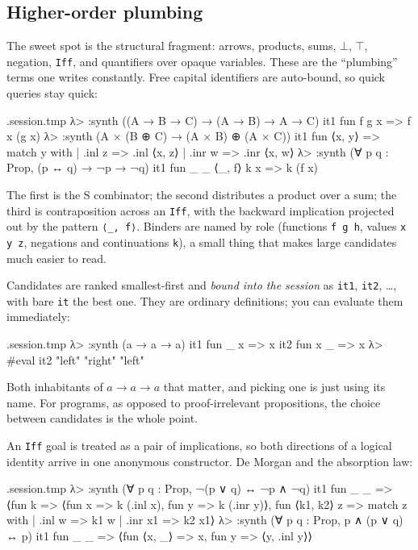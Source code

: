 \documentclass[11pt,oneside]{article}
\newcommand{\code}[1]{\texttt{#1}}
\newenvironment{session}
 {\VerbatimEnvironment\begin{VerbatimOut}{\jobname.session.tmp}}
 {\end{VerbatimOut}%
  \begin{sessionouter}%
  \VerbatimInput[fontsize=\footnotesize, breaklines=true,
    breaksymbolleft={\textcolor{stone}{\footnotesize$\hookrightarrow$}},
    formatcom=\color{ink}, tabsize=4]{\jobname.session.tmp}%
  \end{sessionouter}}
\begin{document}
\subsection{Higher-order plumbing}\label{sec:plumbing}

The sweet spot is the structural fragment: arrows, products, sums,
$\bot$, $\top$, negation, \code{Iff}, and quantifiers over opaque
variables. These are the ``plumbing'' terms one writes constantly.
Free capital identifiers are auto-bound, so quick queries stay quick:

\begin{session}
λ> :synth ((A → B → C) → (A → B) → A → C)
  it1  fun f g x => f x (g x)
λ> :synth (A × (B ⊕ C) → (A × B) ⊕ (A × C))
  it1  fun ⟨x, y⟩ => match y with | .inl z => .inl ⟨x, z⟩ | .inr w => .inr ⟨x, w⟩
λ> :synth (∀ p q : Prop, (p ↔ q) → ¬p → ¬q)
  it1  fun _ _ ⟨_, f⟩ k x => k (f x)
\end{session}

The first is the S combinator; the second distributes a product over a
sum; the third is contraposition across an \code{Iff}, with the
backward implication projected out by the pattern
\code{⟨\_, f⟩}. Binders are named by role (functions \code{f g h},
values \code{x y z}, negations and continuations \code{k}), a small
thing that makes large candidates much easier to read.

Candidates are ranked smallest-first and \emph{bound into the session}
as \code{it1}, \code{it2}, \dots, with bare \code{it} the best one.
They are ordinary definitions; you can evaluate them immediately:

\begin{session}
λ> :synth (a → a → a)
  it1  fun _ x => x
  it2  fun x _ => x
λ> #eval it2 "left" "right"
"left"
\end{session}

Both inhabitants of $a \to a \to a$ that matter, and picking one is
just using its name. For programs, as opposed to proof-irrelevant
propositions, the choice between candidates is the whole point.

An \code{Iff} goal is treated as a pair of implications, so both
directions of a logical identity arrive in one anonymous constructor.
De Morgan and the absorption law:

\begin{session}
λ> :synth (∀ p q : Prop, ¬(p ∨ q) ↔ ¬p ∧ ¬q)
  it1  fun _ _ => ⟨fun k => ⟨fun x => k (.inl x), fun y => k (.inr y)⟩, fun ⟨k1, k2⟩ z => match z with | .inl w => k1 w | .inr x1 => k2 x1⟩
λ> :synth (∀ p q : Prop, p ∧ (p ∨ q) ↔ p)
  it1  fun _ _ => ⟨fun ⟨x, _⟩ => x, fun y => ⟨y, .inl y⟩⟩
\end{session}
\end{document}
